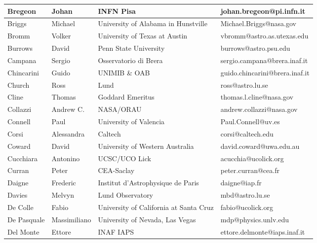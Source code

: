 \begin{center}
\begin{longtable}{|p{1.28cm} |p{1.28cm} |p{2.9cm} |p{3cm} |}
\tiny Bregeon &\tiny Johan & \tiny INFN Pisa & \tiny johan.bregeon@pi.infn.it \\ \hline
\tiny Briggs &\tiny Michael & \tiny University of Alabama in Hunstville & \tiny Michael.Briggs@nasa.gov \\ \hline
\tiny Bromm &\tiny Volker & \tiny University of Texas at Austin & \tiny vbromm@astro.as.utexas.edu \\ \hline
\tiny Burrows &\tiny David & \tiny Penn State University & \tiny burrows@astro.psu.edu \\ \hline
\tiny Campana &\tiny Sergio & \tiny Osservatorio di Brera & \tiny sergio.campana@brera.inaf.it \\ \hline
\tiny Chincarini &\tiny Guido & \tiny UNIMIB \& OAB & \tiny guido.chincarini@brera.inaf.it \\ \hline
\tiny Church &\tiny Ross & \tiny Lund & \tiny ross@astro.lu.se \\ \hline
\tiny Cline &\tiny Thomas & \tiny Goddard Emeritus & \tiny thomas.l.cline@nasa.gov \\ \hline
\tiny Collazzi &\tiny Andrew C. & \tiny NASA/ORAU & \tiny andrew.collazzi@nasa.gov \\ \hline
\tiny Connell &\tiny Paul & \tiny University of Valencia & \tiny Paul.Connell@uv.es \\ \hline
\tiny Corsi &\tiny Alessandra & \tiny Caltech & \tiny corsi@caltech.edu \\ \hline
\tiny Coward &\tiny David & \tiny University of Western Australia & \tiny david.coward@uwa.edu.au \\ \hline
\tiny Cucchiara &\tiny Antonino & \tiny UCSC/UCO Lick & \tiny acucchia@ucolick.org \\ \hline
\tiny Curran &\tiny Peter & \tiny CEA-Saclay & \tiny peter.curran@cea.fr \\ \hline
\tiny Daigne &\tiny Frederic & \tiny Institut d'Astrophysique de Paris & \tiny daigne@iap.fr \\ \hline
\tiny Davies &\tiny Melvyn & \tiny Lund Observatory & \tiny mbd@astro.lu.se \\ \hline
\tiny De Colle &\tiny Fabio & \tiny University of California at Santa Cruz & \tiny fabio@ucolick.org \\ \hline
\tiny De Pasquale &\tiny Massimiliano & \tiny University of Nevada, Las Vegas & \tiny mdp@physics.unlv.edu \\ \hline
\tiny Del Monte &\tiny Ettore & \tiny INAF IAPS & \tiny ettore.delmonte@iaps.inaf.it \\ \hline

\end{longtable}
\end{center}
